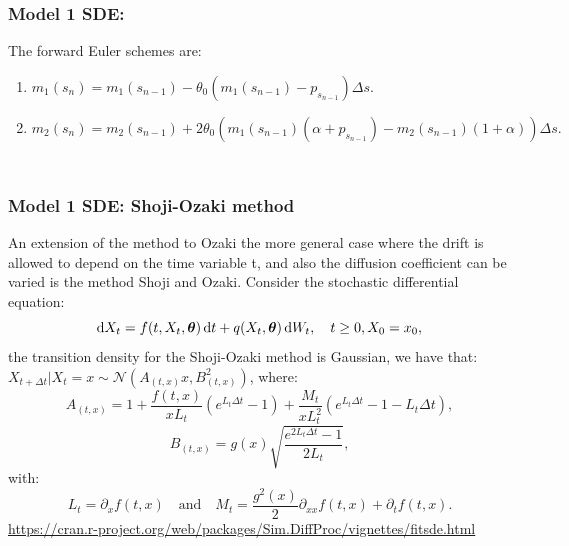 \documentclass[aspectratio=169]{beamer}\usepackage[utf8]{inputenc}
\begin{document}

\begin{frame}\frametitle{Model 1 SDE:}

The forward Euler schemes are:
\begin{enumerate}

\item $m_1(s_{n})=m_1(s_{n-1})-\theta_0(m_1(s_{n-1})-p_{s_{n-1}})\Delta s.$

\item $m_2(s_{n})=m_2(s_{n-1})+2\theta_0\left(m_1(s_{n-1})(\alpha+p_{s_{n-1}})-m_2(s_{n-1})(1+\alpha)\right)\Delta s.$
\end{enumerate}

\begin{center}
\begin{tabular}{|c|}
\toprule
{\tiny

}\\
\bottomrule
\end{tabular}
\end{center}
\begin{center}
\begin{tabular}{|c|}
\toprule
{\tiny

}\\
\bottomrule
\end{tabular}
\end{center}

\end{frame}


\begin{frame}\frametitle{Model 1 SDE: Shoji-Ozaki method}
{\footnotesize
An extension of the method to Ozaki the more general case where the drift is allowed to depend on the time variable t, and also the diffusion coefficient can be varied is the method Shoji and Ozaki. Consider the stochastic differential equation:
\begin{equation*}
\dif X_t=f(t,X_t,\bm{\theta})\dif t+q(X_t,\bm{\theta})\dif W_t,\quad t\geq0,X_0=x_0,
\end{equation*}
the transition density for the Shoji-Ozaki method is Gaussian, we have that: $X_{t+\Delta t}|X_t=x\sim\mathcal{N}\left(A_{(t,x)}x,B^2_{(t,x)}\right)$, where:
\begin{equation*}
A_{(t,x)}=1+\frac{f(t,x)}{xL_t}\left(e^{L_t\Delta t}-1\right)+\frac{M_t}{xL^2_t}\left(e^{L_t\Delta t}-1-L_t\Delta t\right),
\end{equation*}
\begin{equation*}
B_{(t,x)}=g(x)\sqrt{\frac{e^{2L_t\Delta t}-1}{2L_t}},
\end{equation*}
with:
\begin{equation*}
L_t=\partial_xf(t,x)\quad\text{and}\quad M_t=\frac{g^2(x)}{2}\partial_{xx}f(t,x)+\partial_tf(t,x).
\end{equation*}}
{\tiny
\url{https://cran.r-project.org/web/packages/Sim.DiffProc/vignettes/fitsde.html}}
\end{frame}
\end{document}
